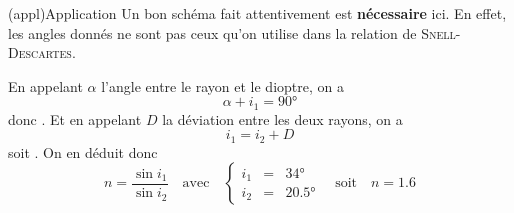 \documentclass[../TDO1-O2.tex]{subfiles}%
\begin{document}
{	\begin{tcn}(appl){Application}
		Un bon schéma fait attentivement est \textbf{nécessaire} ici. En effet,
		les angles donnés ne sont pas ceux qu'on utilise dans la relation de
		\textsc{Snell-Descartes}. \bigbreak

		En appelant $\alpha$ l'angle entre le rayon et le dioptre, on a
		\[ \alpha + i_1 = \ang{90;;}\]
		donc . Et en appelant $D$ la déviation entre
		les deux rayons, on a
		\[ i_1 = i_2 + D\]
		soit . On en déduit donc
		\[\boxed{n = \frac{\sin i_1}{\sin i_2}} \quad \text{avec} \quad
			\left\{
			\begin{array}{rcl}
				i_1 & = & \ang{34;;}   \\
				i_2 & = & \ang{20.5;;}
			\end{array}
			\right. \quad \text{soit} \quad \boxed{n = 1.6}
		\]
	\end{tcn}
}
\end{document}
